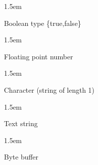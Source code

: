 \documentclass{article}
\begin{document}
\begin{mddefinitions}%


\begin{mdbmarginx}{}{}{}{1.5em}%
\begin{mddefdata}%

Boolean type \{true,false\}%
\end{mddefdata}%
\end{mdbmarginx}%


\begin{mdbmarginx}{}{}{}{1.5em}%
\begin{mddefdata}%

Floating point number%
\end{mddefdata}%
\end{mdbmarginx}%


\begin{mdbmarginx}{}{}{}{1.5em}%
\begin{mddefdata}%

Character (string of length 1)%
\end{mddefdata}%
\end{mdbmarginx}%


\begin{mdbmarginx}{}{}{}{1.5em}%
\begin{mddefdata}%

Text string%
\end{mddefdata}%
\end{mdbmarginx}%


\begin{mdbmarginx}{}{}{}{1.5em}%
\begin{mddefdata}%

Byte buffer%
\end{mddefdata}%
\end{mdbmarginx}%


\end{mddefinitions}
\end{document}
